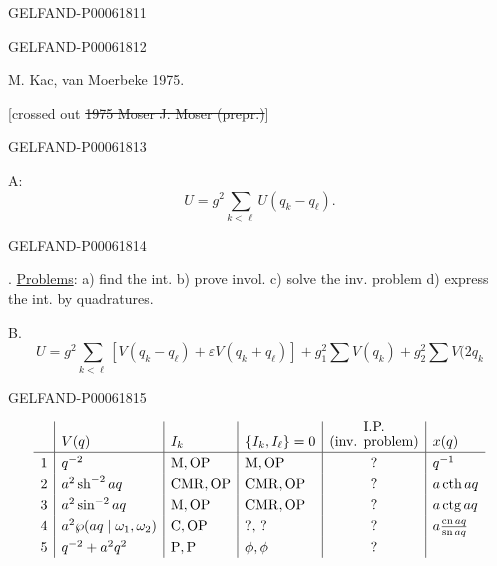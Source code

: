 \begin{GelfandAdjacentEvidence}{GELFAND-P000618}{11}

\end{GelfandAdjacentEvidence}
\begin{GelfandAdjacentEvidence}{GELFAND-P000618}{12}


M. Kac, van Moerbeke 1975.

\hfill[crossed out \sout{1975 Moser J. Moser (prepr.)}]
\end{GelfandAdjacentEvidence}
\begin{GelfandAdjacentEvidence}{GELFAND-P000618}{13}


A:
\[
U=g^2\sum_{k<\ell}U(q_k-q_\ell).
\]
\end{GelfandAdjacentEvidence}
\begin{GelfandAdjacentEvidence}{GELFAND-P000618}{14}

. \underline{Problems}: a) find the int. b) prove invol. c) solve the inv. problem d) express the int. by quadratures.

B.
\[
U=g^2\sum_{k<\ell}[V(q_k-q_\ell)+\varepsilon V(q_k+q_\ell)]
+g_1^2\sum V(q_k)+g_2^2\sum V(2q_k
\]
\end{GelfandAdjacentEvidence}
\begin{GelfandAdjacentEvidence}{GELFAND-P000618}{15}


{\small
\[
\renewcommand{\arraystretch}{1.25}
\begin{array}{c|l|l|l|c|l}
 &V(q)&I_k&\{I_k,I_\ell\}=0&
 \text{\shortstack{I.P.\\(inv. problem)}}&x(q)\\\hline
1&q^{-2}&\mathrm{M,OP}&\mathrm{M,OP}&?&q^{-1}\\
2&a^2\operatorname{sh}^{-2}aq&\mathrm{CMR,OP}&\mathrm{CMR,OP}&?&a\operatorname{cth}aq\\
3&a^2\sin^{-2}aq&\mathrm{M,OP}&\mathrm{CMR,OP}&?&a\operatorname{ctg}aq\\
4&a^2\wp(aq\mid\omega_1,\omega_2)&\mathrm{C,OP}&?,\,?&?&a\frac{\operatorname{cn}aq}{\operatorname{sn}aq}\\
5&q^{-2}+a^2q^2&\mathrm{P,P}&\phi,\phi&?&
\end{array}
\]
}
\end{GelfandAdjacentEvidence}

